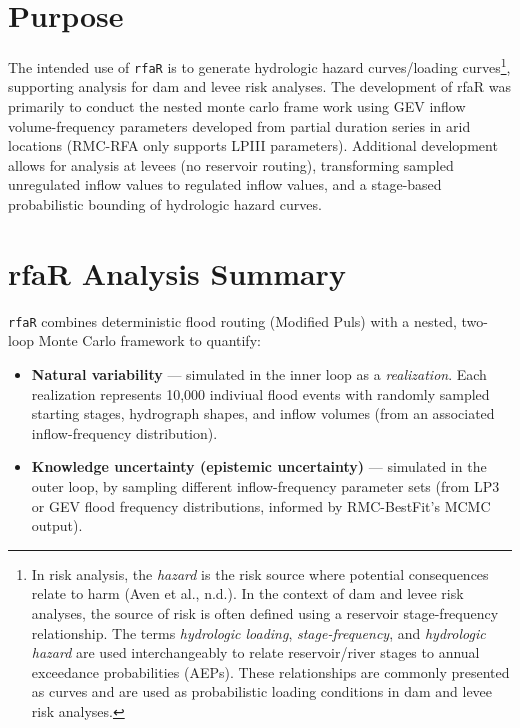 \documentclass[
  letterpaper,
  DIV=11,
  numbers=noendperiod]{scrreprt}
\begin{document}
\section{Purpose}\label{purpose}

The intended use of \texttt{rfaR} is to generate hydrologic hazard
curves/loading curves\footnote{In risk analysis, the \emph{hazard} is
  the risk source where potential consequences relate to harm (Aven et
  al., n.d.). In the context of dam and levee risk analyses, the source
  of risk is often defined using a reservoir stage-frequency
  relationship. The terms \emph{hydrologic loading},
  \emph{stage-frequency}, and \emph{hydrologic hazard} are used
  interchangeably to relate reservoir/river stages to annual exceedance
  probabilities (AEPs). These relationships are commonly presented as
  curves and are used as probabilistic loading conditions in dam and
  levee risk analyses.}, supporting analysis for dam and levee risk
analyses. The development of rfaR was primarily to conduct the nested
monte carlo frame work using GEV inflow volume-frequency parameters
developed from partial duration series in arid locations (RMC-RFA only
supports LPIII parameters). Additional development allows for analysis
at levees (no reservoir routing), transforming sampled unregulated
inflow values to regulated inflow values, and a stage-based
probabilistic bounding of hydrologic hazard curves.

\section{rfaR Analysis Summary}\label{rfar-analysis-summary}

\texttt{rfaR} combines deterministic flood routing (Modified Puls) with
a nested, two-loop Monte Carlo framework to quantify:

\begin{itemize}
\item
  \textbf{Natural variability} --- simulated in the inner loop as a
  \emph{realization}. Each realization represents 10,000 indiviual flood
  events with randomly sampled starting stages, hydrograph shapes, and
  inflow volumes (from an associated inflow-frequency distribution).
\item
  \textbf{Knowledge uncertainty (epistemic uncertainty)} --- simulated
  in the outer loop, by sampling different inflow-frequency parameter
  sets (from LP3 or GEV flood frequency distributions, informed by
  RMC-BestFit's MCMC output).
\end{itemize}
\end{document}
